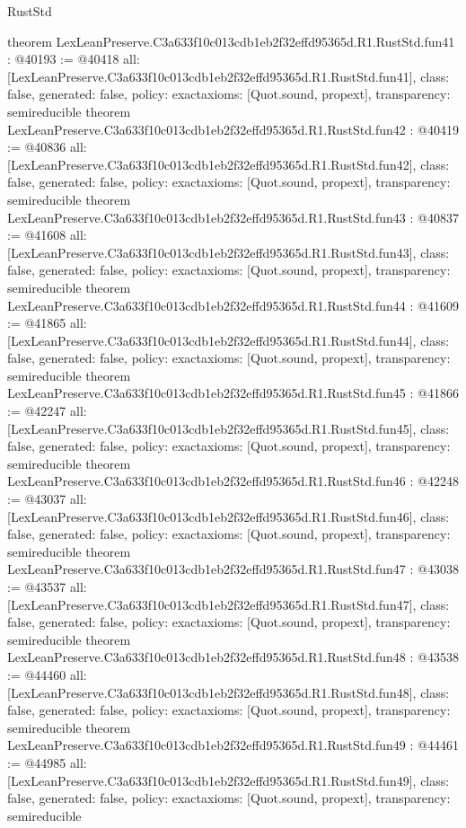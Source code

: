 \begin{lexlean}{RustStd}
\begin{coremodule}
{}
theorem LexLeanPreserve.C3a633f10c013cdb1eb2f32effd95365d.R1.RustStd.fun41 : @40193 := @40418 {
  all: [LexLeanPreserve.C3a633f10c013cdb1eb2f32effd95365d.R1.RustStd.fun41],
  class: false,
  generated: false,
  policy: exact{axioms: [Quot.sound, propext]},
  transparency: semireducible
}
theorem LexLeanPreserve.C3a633f10c013cdb1eb2f32effd95365d.R1.RustStd.fun42 : @40419 := @40836 {
  all: [LexLeanPreserve.C3a633f10c013cdb1eb2f32effd95365d.R1.RustStd.fun42],
  class: false,
  generated: false,
  policy: exact{axioms: [Quot.sound, propext]},
  transparency: semireducible
}
theorem LexLeanPreserve.C3a633f10c013cdb1eb2f32effd95365d.R1.RustStd.fun43 : @40837 := @41608 {
  all: [LexLeanPreserve.C3a633f10c013cdb1eb2f32effd95365d.R1.RustStd.fun43],
  class: false,
  generated: false,
  policy: exact{axioms: [Quot.sound, propext]},
  transparency: semireducible
}
theorem LexLeanPreserve.C3a633f10c013cdb1eb2f32effd95365d.R1.RustStd.fun44 : @41609 := @41865 {
  all: [LexLeanPreserve.C3a633f10c013cdb1eb2f32effd95365d.R1.RustStd.fun44],
  class: false,
  generated: false,
  policy: exact{axioms: [Quot.sound, propext]},
  transparency: semireducible
}
theorem LexLeanPreserve.C3a633f10c013cdb1eb2f32effd95365d.R1.RustStd.fun45 : @41866 := @42247 {
  all: [LexLeanPreserve.C3a633f10c013cdb1eb2f32effd95365d.R1.RustStd.fun45],
  class: false,
  generated: false,
  policy: exact{axioms: [Quot.sound, propext]},
  transparency: semireducible
}
theorem LexLeanPreserve.C3a633f10c013cdb1eb2f32effd95365d.R1.RustStd.fun46 : @42248 := @43037 {
  all: [LexLeanPreserve.C3a633f10c013cdb1eb2f32effd95365d.R1.RustStd.fun46],
  class: false,
  generated: false,
  policy: exact{axioms: [Quot.sound, propext]},
  transparency: semireducible
}
theorem LexLeanPreserve.C3a633f10c013cdb1eb2f32effd95365d.R1.RustStd.fun47 : @43038 := @43537 {
  all: [LexLeanPreserve.C3a633f10c013cdb1eb2f32effd95365d.R1.RustStd.fun47],
  class: false,
  generated: false,
  policy: exact{axioms: [Quot.sound, propext]},
  transparency: semireducible
}
theorem LexLeanPreserve.C3a633f10c013cdb1eb2f32effd95365d.R1.RustStd.fun48 : @43538 := @44460 {
  all: [LexLeanPreserve.C3a633f10c013cdb1eb2f32effd95365d.R1.RustStd.fun48],
  class: false,
  generated: false,
  policy: exact{axioms: [Quot.sound, propext]},
  transparency: semireducible
}
theorem LexLeanPreserve.C3a633f10c013cdb1eb2f32effd95365d.R1.RustStd.fun49 : @44461 := @44985 {
  all: [LexLeanPreserve.C3a633f10c013cdb1eb2f32effd95365d.R1.RustStd.fun49],
  class: false,
  generated: false,
  policy: exact{axioms: [Quot.sound, propext]},
  transparency: semireducible
}
\end{coremodule}
\end{lexlean}
